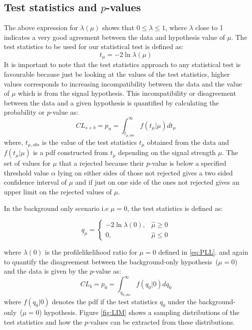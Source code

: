 \subsection{Test statistics and $p$-values}
\par
The above expression for $\lambda(\mu)$ shows that $0 \leq \lambda \leq 1$, where $\lambda$ close to 1 indicates a very good agreement between the data and hypothesis value of $\mu$.
The test statistics  to be used for our statistical test is defined as:
\begin{equation}
 t_{\mu} = -2\ln \lambda(\mu)
\end{equation}
It is important to note that the test statistics approach to any statistical test is favourable because just be looking at the values of the test statistics, higher values corresponds to increasing incompatibility between the data and the value of $\mu$ which is from the signal hypothesis. 
This incompatibility or disagreement between the data and a given hypothesis is quantified by calculating the probability or $p$-value as:
\begin{equation}
 CL_{s+b} = p_{u} = \int^{\infty}_{t_{\mu,obs}} f(t_{\mu}|\mu) dt_{\mu}
\end{equation}
where, $t_{\mu,obs}$ is the value of the test statistics $t_{\mu}$ obtained from the data and $f(t_{\mu}|\mu)$ is a pdf constructed from $t_{\mu}$ depending on the signal strength $\mu$.
The set of values for $\mu$ that a rejected because their $p$-value is below a specified threshold value $\alpha$
lying on either sides of those not rejected gives a two sided confidence interval of $\mu$ and if just on one side of the ones not rejected gives an upper limit on the rejected values of $\mu$.

In the background only scenario i.e $\mu = 0$, the test statistics is defined as:

\[\label{eq:HNULL}
 q_{\mu} = \left\lbrace  
  \begin{array}{ll}
 -2\ln \lambda(0), & \hat{\mu} \geq 0 \\
   0,              & \hat{\mu} \leq 0
  \end{array}
  \right.
\]

where $\lambda(0)$ is the profilelikelihood ratio for $\mu = 0$  defined in \ref{eq:PLL}.
and again to quantify the disagreement between the background-only hypothesis~($\mu = 0$) and the data is given by the $p$-value as:
\begin{equation}
 CL_{b} = p_{0} = \int^{\infty}_{q_{0,obs}} f(q_{0}|0) dq_{0}
\end{equation}
where $f(q_{0}|0)$ denotes the pdf if the test statistics $q_{0}$ under the background-only~($\mu = 0$) hypothesis.
Figure \ref{fig:LIM} shows a sampling distributions of the test statistics and how the $p$-values can be extracted from these distributions.

